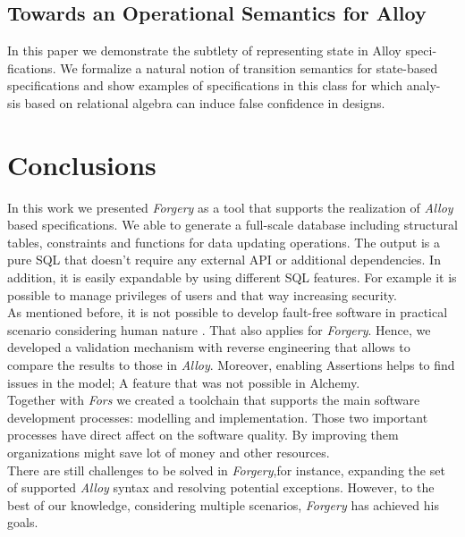 \documentclass[oneside]{book}
\begin{document}
\section{Towards an Operational Semantics for Alloy}
In this paper we demonstrate the subtlety of representing state in Alloy speci- fications. We formalize a natural notion of transition semantics for state-based specifications and show examples of specifications in this class for which analy- sis based on relational algebra can induce false confidence in designs.

\newpage

\chapter{Conclusions}

In this work we presented \textit{Forgery} as a tool that supports the realization of \textit{Alloy} based specifications. We able to generate a full-scale database including structural tables, constraints and functions for data updating operations. The output is a pure SQL that doesn't require any external API or additional dependencies. In addition, it is easily expandable by using different SQL features. For example it is possible to manage privileges of users and that way increasing security.\\ 

As mentioned before, it is not possible to develop fault-free software in practical scenario considering human nature \cite{reliability}. That also applies for \textit{Forgery}. Hence, we developed a validation mechanism with reverse engineering that allows to compare the results to those in \textit{Alloy}. Moreover, enabling Assertions helps to find issues in the model; A feature that was not possible in Alchemy.\\

Together with \textit{Fors} we created a toolchain that supports the main software development processes: modelling and implementation. Those two important processes have direct affect on the software quality. By improving them organizations might save lot of money and other resources.\\

There are still challenges to be solved in \textit{Forgery},for instance, expanding the set of supported \textit{Alloy} syntax and resolving potential exceptions. However, to the best of our knowledge, considering multiple scenarios, \textit{Forgery} has achieved his goals. 
\end{document}
